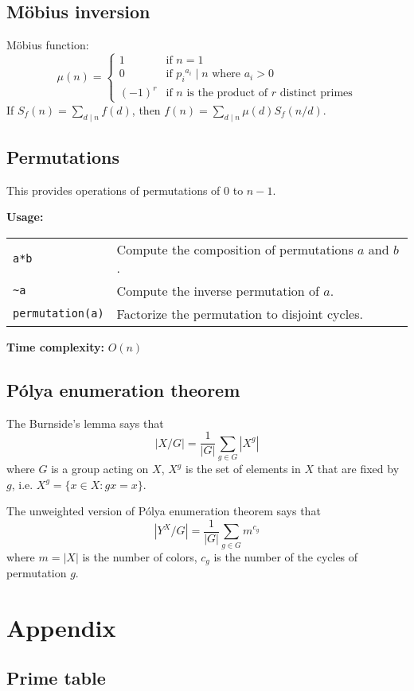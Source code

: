 \subsection{M\"{o}bius inversion}
M\"{o}bius function:
$$ \mu(n) = \begin{cases} 1 & \text{if } n=1  \\ 0 & \text{if } {p_i}^{a_i} \mid n \text{ where } a_i > 0 \\ (-1)^r & \text{if } n \text{ is the product of } r \text{ distinct primes} \end{cases} $$
If $S_f(n) = \sum_{d \mid n} f(d)$, then $f(n) = \sum_{d \mid n} \mu(d) S_f(n/d)$.

\subsection{Permutations}
This provides operations of permutations of $0$ to $n-1$. \par
\textbf{Usage:} \\[0.1cm]
\begin{tabular}{p{3cm} p{8.5cm}}
  \lstinline|a*b| & Compute the composition of permutations $a$ and $b$. \\
  \lstinline|~a| & Compute the inverse permutation of $a$. \\
  \lstinline|permutation(a)| & Factorize the permutation to disjoint cycles.
\end{tabular} \par
\textbf{Time complexity:} $O(n)$ \par


\subsection{P\'olya enumeration theorem}
The Burnside's lemma says that
$$ |X / G| = \frac{1}{|G|} \sum_{g \in G} |X^g| $$
where $G$ is a group acting on $X$, $X^g$ is the set of elements in $X$ that are fixed by $g$, i.e. $X^g = \{x \in X : gx = x\}$. \par
The unweighted version of P\'olya enumeration theorem says that
$$ |Y^X / G| = \frac{1}{|G|} \sum_{g \in G} m^{c_g} $$
where $m = |X|$ is the number of colors, $c_g$ is the number of the cycles of permutation $g$.

\newpage
\section{Appendix}
\subsection{Prime table}
